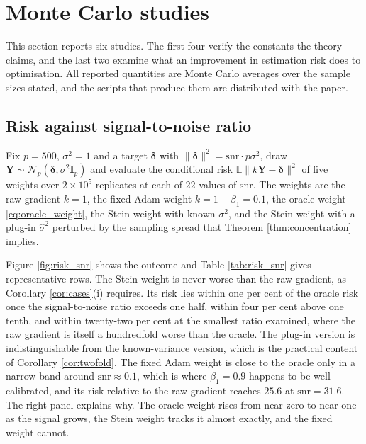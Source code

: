 \documentclass[pdflatex,sn-mathphys-num]{sn-jnl}%
\theoremstyle{thmstyleone}%
\theoremstyle{thmstyletwo}%
\theoremstyle{thmstylethree}%
\newcommand{\E}{\mathbb{E}}
\begin{document}
\section{Monte Carlo studies}
\label{sec:simulation}

This section reports six studies. The first four verify the constants the theory claims, and the last two examine what an improvement in estimation risk does to optimisation. All reported quantities are Monte Carlo averages over the sample sizes stated, and the scripts that produce them are distributed with the paper.

\subsection{Risk against signal-to-noise ratio}
\label{sec:sim_snr}

Fix $p=500$, $\sigma^2=1$ and a target $\bm\delta$ with $\|\bm\delta\|^2=\mathrm{snr}\cdot p\sigma^2$, draw $\bm Y\sim\mathcal N_p(\bm\delta,\sigma^2\bm I_p)$ and evaluate the conditional risk $\E\|k\bm Y-\bm\delta\|^2$ of five weights over $2\times10^{5}$ replicates at each of $22$ values of $\mathrm{snr}$. The weights are the raw gradient $k=1$, the fixed Adam weight $k=1-\beta_1=0.1$, the oracle weight \eqref{eq:oracle_weight}, the Stein weight with known $\sigma^2$, and the Stein weight with a plug-in $\hat\sigma^2$ perturbed by the sampling spread that Theorem \ref{thm:concentration} implies.

Figure \ref{fig:risk_snr} shows the outcome and Table \ref{tab:risk_snr} gives representative rows. The Stein weight is never worse than the raw gradient, as Corollary \ref{cor:cases}(i) requires. Its risk lies within one per cent of the oracle risk once the signal-to-noise ratio exceeds one half, within four per cent above one tenth, and within twenty-two per cent at the smallest ratio examined, where the raw gradient is itself a hundredfold worse than the oracle. The plug-in version is indistinguishable from the known-variance version, which is the practical content of Corollary \ref{cor:twofold}. The fixed Adam weight is close to the oracle only in a narrow band around $\mathrm{snr}\approx0.1$, which is where $\beta_1=0.9$ happens to be well calibrated, and its risk relative to the raw gradient reaches $25.6$ at $\mathrm{snr}=31.6$. The right panel explains why. The oracle weight rises from near zero to near one as the signal grows, the Stein weight tracks it almost exactly, and the fixed weight cannot.
\end{document}
